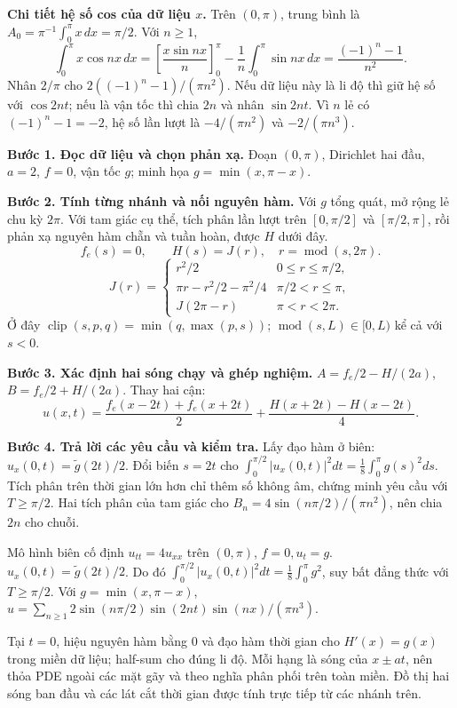 \textbf{Chi tiết hệ số cos của dữ liệu $x$.} Trên $(0,\pi)$, trung bình là $A_0=\pi^{-1}\int_0^\pi x\,dx=\pi/2$. Với $n\ge1$,
\[\int_0^\pi x\cos nx\,dx=\left[\frac{x\sin nx}{n}\right]_0^\pi-\frac1n\int_0^\pi\sin nx\,dx
=\frac{(-1)^n-1}{n^2}.\]
Nhân $2/\pi$ cho $2((-1)^n-1)/(\pi n^2)$. Nếu dữ liệu này là li độ thì giữ hệ số với $\cos2nt$; nếu là vận tốc thì chia $2n$ và nhân $\sin2nt$. Vì $n$ lẻ có $(-1)^n-1=-2$, hệ số lần lượt là $-4/(\pi n^2)$ và $-2/(\pi n^3)$.

\textbf{Bước 1. Đọc dữ liệu và chọn phản xạ.} Đoạn $(0,\pi)$, Dirichlet hai đầu, $a=2$, $f=0$, vận tốc $g$; minh họa $g=\min(x,\pi-x)$.

\textbf{Bước 2. Tính từng nhánh và nối nguyên hàm.} Với $g$ tổng quát, mở rộng lẻ chu kỳ $2\pi$. Với tam giác cụ thể, tích phân lần lượt trên $[0,\pi/2]$ và $[\pi/2,\pi]$, rồi phản xạ nguyên hàm chẵn và tuần hoàn, được $H$ dưới đây.
\[f_e(s)=0,\qquad H(s)=J(r),\quad r=\operatorname{mod}(s,2\pi).\]
\[J(r)=\begin{cases}r^2/2&0\le r\le\pi/2,\\\pi r-r^2/2-\pi^2/4&\pi/2<r\le\pi,\\J(2\pi-r)&\pi<r<2\pi.\end{cases}\]
Ở đây $\operatorname{clip}(s,p,q)=\min(q,\max(p,s))$; $\operatorname{mod}(s,L)\in[0,L)$ kể cả với $s<0$.

\textbf{Bước 3. Xác định hai sóng chạy và ghép nghiệm.} $A=f_e/2-H/(2a)$, $B=f_e/2+H/(2a)$. Thay hai cận:
\[u(x,t)=\frac{f_e(x-2t)+f_e(x+2t)}2+\frac{H(x+2t)-H(x-2t)}{4}.\]

\textbf{Bước 4. Trả lời các yêu cầu và kiểm tra.} Lấy đạo hàm ở biên: $u_x(0,t)=\widetilde g(2t)/2$. Đổi biến $s=2t$ cho $\int_0^{\pi/2}|u_x(0,t)|^2dt=\frac18\int_0^\pi g(s)^2ds$. Tích phân trên thời gian lớn hơn chỉ thêm số không âm, chứng minh yêu cầu với $T\ge\pi/2$. Hai tích phân của tam giác cho $B_n=4\sin(n\pi/2)/(\pi n^2)$, nên chia $2n$ cho chuỗi.

Mô hình biên cố định $u_{tt}=4u_{xx}$ trên $(0,\pi)$, $f=0,u_t=g$. $u_x(0,t)=\widetilde g(2t)/2$. Do đó $\int_0^{\pi/2}|u_x(0,t)|^2dt=\frac18\int_0^\pi g^2$, suy bất đẳng thức với $T\ge\pi/2$. Với $g=\min(x,\pi-x)$, $u=\sum_{n\ge1}2\sin(n\pi/2)\sin(2nt)\sin(nx)/(\pi n^3)$.

Tại $t=0$, hiệu nguyên hàm bằng $0$ và đạo hàm thời gian cho $H'(x)=g(x)$ trong miền dữ liệu; half-sum cho đúng li độ. Mỗi hạng là sóng của $x\pm at$, nên thỏa PDE ngoài các mặt gãy và theo nghĩa phân phối trên toàn miền. Đồ thị hai sóng ban đầu và các lát cắt thời gian được tính trực tiếp từ các nhánh trên.

